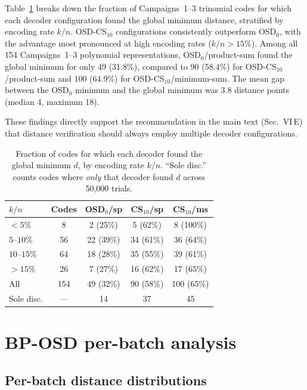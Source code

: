 \documentclass[aps,prxquantum,twocolumn,superscriptaddress,nofootinbib]{revtex4-2}
\begin{document}
Table~\ref{tab:decoder_rates} breaks down the fraction of Campaigns~1--3 trinomial codes for which each decoder configuration found the global minimum distance, stratified by encoding rate $k/n$.
OSD-CS$_{10}$ configurations consistently outperform OSD$_0$, with the advantage most pronounced at high encoding rates ($k/n > 15\%$).
Among all 154 Campaigns~1--3 polynomial representations, OSD$_0$/product-sum found the global minimum for only 49 (31.8\%), compared to 90 (58.4\%) for OSD-CS$_{10}$/product-sum and 100 (64.9\%) for OSD-CS$_{10}$/minimum-sum.
The mean gap between the OSD$_0$ minimum and the global minimum was 3.8 distance points (median 4, maximum 18).

These findings directly support the recommendation in the main text (Sec.~VI\,E) that distance verification should always employ multiple decoder configurations.

\begin{table}[h]
\centering
\caption{Fraction of codes for which each decoder found the global minimum $d$, by encoding rate $k/n$.  ``Sole disc.'' counts codes where \emph{only} that decoder found $d$ across 50{,}000 trials.}
\label{tab:decoder_rates}
\begin{tabular}{lcccc}
\toprule
$k/n$ & Codes & OSD$_0$/sp & CS$_{10}$/sp & CS$_{10}$/ms \\
\midrule
$<5\%$ & 8 & 2 (25\%) & 5 (62\%) & 8 (100\%) \\
$5$--$10\%$ & 56 & 22 (39\%) & 34 (61\%) & 36 (64\%) \\
$10$--$15\%$ & 64 & 18 (28\%) & 35 (55\%) & 39 (61\%) \\
$>15\%$ & 26 & 7 (27\%) & 16 (62\%) & 17 (65\%) \\
\midrule
All & 154 & 49 (32\%) & 90 (58\%) & 100 (65\%) \\
Sole disc. & --- & 14 & 37 & 45 \\
\bottomrule
\end{tabular}
\end{table}

\section{BP-OSD per-batch analysis}
\label{sm:per_batch}

\subsection{Per-batch distance distributions}
\end{document}
